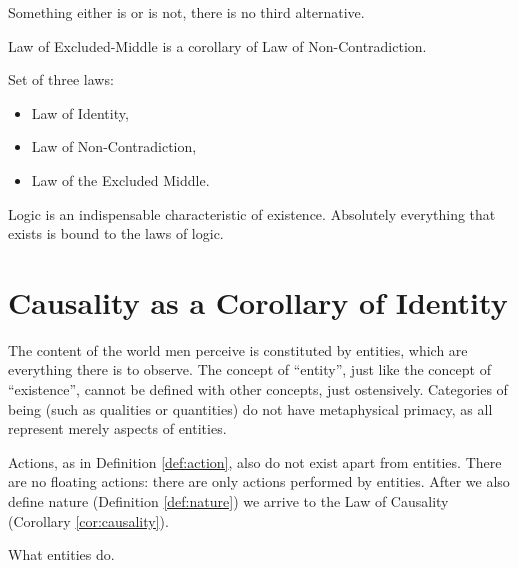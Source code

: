             \begin{corollary}
            \label{cor:excluded}
                Something either is or is not, there is no third alternative.
            \end{corollary}

            \begin{remark}
                Law of Excluded-Middle is a corollary of Law of Non-Contradiction.
            \end{remark}

            \begin{definition}[Logic]
            \label{def:logic}
                Set of three laws:
                \begin{itemize}
                    \item Law of Identity,
                    \item Law of Non-Contradiction,
                    \item Law of the Excluded Middle.
                \end{itemize}
            \end{definition}
            
        Logic is an indispensable characteristic of existence. Absolutely everything that exists is bound to the laws of logic.
            
    \section{Causality as a Corollary of Identity}
        
        The content of the world men perceive is constituted by entities, which are everything there is to observe. The concept of ``entity'', just like the concept of ``existence'', cannot be defined with other concepts, just ostensively. Categories of being (such as qualities or quantities) do not have metaphysical primacy, as all represent merely aspects of entities.

        Actions, as in Definition \ref{def:action}, also do not exist apart from entities. There are no floating actions: there are only actions performed by entities. After we also define nature (Definition \ref{def:nature}) we arrive to the Law of Causality (Corollary \ref{cor:causality}).
        
            \begin{definition}[Action]
            \label{def:action}
                What entities do.
            \end{definition}
            
